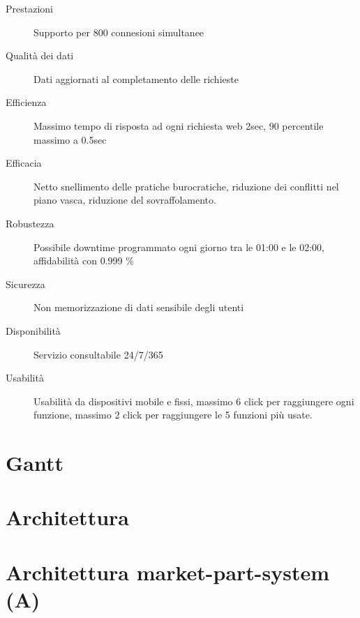 \documentclass[11pt]{article} %
\begin{document}
\begin{description}
	\item[Prestazioni] Supporto per 800 connesioni simultanee
	\item[Qualità dei dati] Dati aggiornati al completamento delle richieste
	\item[Efficienza] Massimo tempo di risposta ad ogni richiesta web 2sec, 90 percentile massimo a 0.5sec
	\item[Efficacia] Netto snellimento delle pratiche burocratiche, riduzione dei conflitti nel piano vasca, riduzione del sovraffolamento.
	\item[Robustezza] Possibile downtime programmato ogni giorno tra le 01:00 e le 02:00, affidabilità con 0.999 \%
	\item[Sicurezza] Non memorizzazione di dati sensibile degli utenti
	\item[Disponibilità] Servizio consultabile 24/7/365
	\item[Usabilità] Usabilità da dispositivi mobile e fissi, massimo 6 click per raggiungere ogni funzione, massimo 2 click per raggiungere le 5 funzioni più usate.
\end{description}


\section{Gantt}



\section{Architettura}

\section{Architettura market-part-system (A)}
\end{document}

